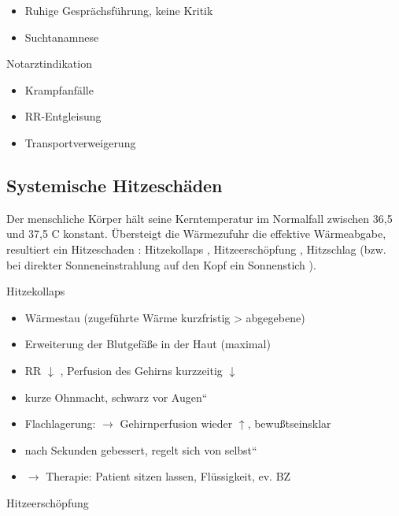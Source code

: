 \documentclass{article}
\begin{document}
\begin{itemize}
\item Ruhige Gespr\"achsf\"uhrung, keine Kritik

\item Suchtanamnese

\end{itemize}
Notarztindikation

\begin{itemize}
\item Krampfanf\"alle

\item RR-Entgleisung

\item Transportverweigerung

\end{itemize}
\subsection{Systemische Hitzesch\"aden}
Der menschliche K\"orper h\"alt seine Kerntemperatur  im Normalfall
zwischen 36,5{\textdegree}  und 37,5{\textdegree} C  konstant.
\"Ubersteigt  die W\"armezufuhr die effektive  W\"armeabgabe,
resultiert ein Hitzeschaden : Hitzekollaps ,  Hitzeersch\"opfung ,
Hitzschlag  (bzw. bei  direkter Sonneneinstrahlung auf den Kopf ein 
Sonnen\-stich ).

Hitzekollaps

\begin{itemize}
\item W\"armestau  (zugef\"uhrte W\"arme  kurzfristig {\textgreater}
abgegebene)

\item Erweiterung der Blutgef\"a{\ss}e in der Haut  (maximal)

\item RR ${\downarrow}$ , Perfusion des Gehirns kurzzeitig
${\downarrow}$

\item kurze Ohnmacht, {\quotedblbase}schwarz vor
Augen{\textquotedblleft}

\end{itemize}
\begin{itemize}
\item Flachlagerung: ${\rightarrow}$ Gehirnperfusion wieder
${\uparrow}$, bewu{\ss}tseinsklar

\item nach Sekunden gebessert, {\quotedblbase}regelt sich von
selbst{\textquotedblleft}

\end{itemize}
\begin{itemize}
\item ${\rightarrow}$ Therapie: Patient sitzen lassen, Fl\"ussigkeit,
ev. BZ

\end{itemize}
Hitzeersch\"opfung
\end{document}
